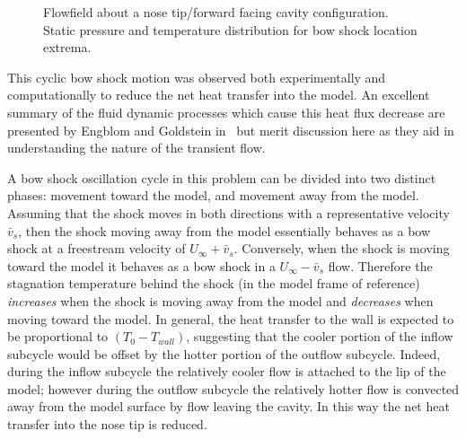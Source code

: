 \begin{figure}[hbtp]
\begin{center}
    \caption{Flowfield about a nose tip/forward facing cavity configuration.  Static pressure and temperature distribution for bow shock location extrema.\label{fig:cavity_LD2_flowfield}}
  \end{center}
\end{figure}
This cyclic bow shock motion was observed both experimentally and computationally to reduce the net heat transfer into the model.  An excellent summary of the fluid dynamic processes which cause this heat flux decrease are presented by Engblom and Goldstein in~\cite{engblom_goldstein_AIAA-1996-354} but merit discussion here as they aid in understanding the nature of the transient flow. 

A bow shock oscillation cycle in this problem can be divided into two distinct phases: movement toward the model, and movement away from the model.  Assuming that the shock moves in both directions with a representative velocity $\bar{v}_s$, then the shock moving away from the model essentially behaves as a bow shock at a freestream velocity of $U_\infty + \bar{v}_s$.  Conversely, when the shock is moving toward the model it behaves as a bow shock in a $U_\infty-\bar{v}_s$ flow.  Therefore the stagnation temperature behind the shock (in the model frame of reference) \emph{increases} when the shock is moving away from the model and \emph{decreases} when moving toward the model.  In general, the heat transfer to the wall is expected to be proportional to $\left(T_0 - T_{wall}\right)$, suggesting that the cooler portion of the inflow subcycle would be offset by the hotter portion of the outflow subcycle.  Indeed, during the inflow subcycle the relatively cooler flow is attached to the lip of the model; however during the outflow subcycle the relatively hotter flow is convected away from the model surface by flow leaving the cavity.  In this way the net heat transfer into the nose tip is reduced.


